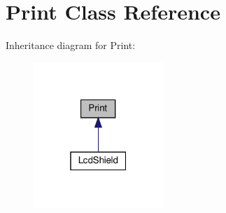 \hypertarget{classPrint}{}\section{Print Class Reference}
\label{classPrint}


Inheritance diagram for Print\+:
\nopagebreak
\begin{figure}[H]
\begin{center}
\leavevmode
\includegraphics[width=139pt]{classPrint__inherit__graph}
\end{center}
\end{figure}
